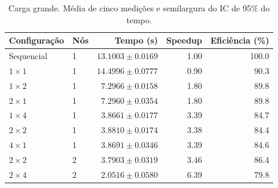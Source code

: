 \begin{table}[htbp]
\centering
\caption{Carga grande. Média de cinco medições e semilargura do IC de 95\% do tempo.}
\label{tab:lasdpc-grande}
\begin{tabular}{llrrr}
\toprule
Configuração & Nós & Tempo (s) & Speedup & Eficiência (\%) \\
\midrule
Sequencial & 1 & $13.1003 \pm 0.0169$ & 1.00 & 100.0 \\
$1 \times 1$ & 1 & $14.4996 \pm 0.0777$ & 0.90 & 90.3 \\
$1 \times 2$ & 1 & $7.2966 \pm 0.0158$ & 1.80 & 89.8 \\
$2 \times 1$ & 1 & $7.2960 \pm 0.0354$ & 1.80 & 89.8 \\
$1 \times 4$ & 1 & $3.8661 \pm 0.0177$ & 3.39 & 84.7 \\
$2 \times 2$ & 1 & $3.8810 \pm 0.0174$ & 3.38 & 84.4 \\
$4 \times 1$ & 1 & $3.8691 \pm 0.0346$ & 3.39 & 84.6 \\
$2 \times 2$ & 2 & $3.7903 \pm 0.0319$ & 3.46 & 86.4 \\
$2 \times 4$ & 2 & $2.0516 \pm 0.0580$ & 6.39 & 79.8 \\
\bottomrule
\end{tabular}
\end{table}
